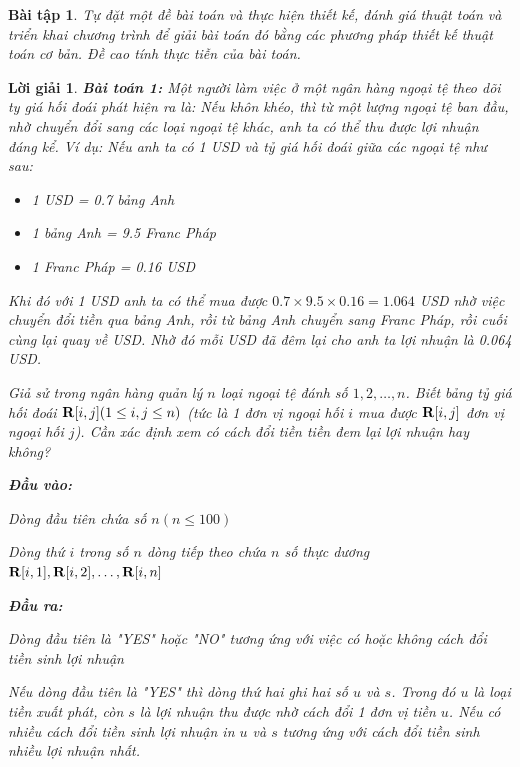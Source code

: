 \documentclass[14pt, a4paper]{article}
\theoremstyle{sltheorem}
\newtheorem{baitap}{Bài tập}
\theoremstyle{soltheorem}
\newtheorem*{loigiai}{Lời giải}
\begin{document}
    \begin{baitap}
        Tự đặt một đề bài toán và thực hiện thiết kế, đánh giá thuật toán và triển khai
        chương trình để giải bài toán đó bằng các phương pháp thiết kế thuật toán cơ bản.
        Đề cao tính thực tiễn của bài toán.

    \end{baitap}

    \begin{loigiai}

        \textbf{Bài toán 1:}
        Một người làm việc ở một ngân hàng ngoại tệ theo dõi ty giá hối đoái phát hiện ra là: Nếu khôn
        khéo, thì từ một lượng ngoại tệ ban đầu, nhờ chuyển đổi sang các loại ngoại tệ khác, anh ta có thể
        thu được lợi nhuận đáng kể.
        Ví dụ: Nếu anh ta có 1 USD và tỷ giá hối đoái giữa các ngoại tệ như sau:
        \begin{itemize}
            \item 1 USD = 0.7 bảng Anh
            \item 1 bảng Anh = 9.5 Franc Pháp 
            \item 1 Franc Pháp = 0.16 USD
        \end{itemize}
        Khi đó với 1 USD anh ta có thể mua được $0.7 \times 9.5 \times 0.16 = 1.064$ USD nhờ việc chuyển đổi tiền qua bảng Anh,
        rồi từ bảng Anh chuyển sang Franc Pháp, rồi cuối cùng lại quay về USD. Nhờ đó mỗi USD đã đêm lại cho anh ta lợi nhuận là 0.064 USD.

        Giả sử trong ngân hàng quản lý $n$ loại ngoại tệ đánh số $1, 2, \dots, n $.
        Biết bảng tỷ giá hối đoái $\bold{R} \lbrack i, j  \rbrack (1 \leq i, j \leq n)$ (tức là 1 đơn vị ngoại hối $i$ mua được $\bold{R} \lbrack i, j \rbrack$ đơn vị ngoại hối $j$).
        Cần xác định xem có cách đổi tiền tiền đem lại lợi nhuận hay không?

        \textbf{Đầu vào:}

        Dòng đầu tiên chứa số $n (n \leq 100)$

        Dòng thứ $i$ trong số $n$ dòng tiếp theo chứa $n$ số thực dương $\bold{R} \lbrack i, 1 \rbrack, \bold{R} \lbrack i, 2 \rbrack, \dots, \bold{R} \lbrack i, n \rbrack$

        \textbf{Đầu ra:}

        Dòng đầu tiên là "YES" hoặc "NO" tương ứng với việc có hoặc không cách đổi tiền sinh lợi nhuận

        Nếu dòng đầu tiên là "YES" thì dòng thứ hai ghi hai số $u$ và $s$. 
        Trong đó $u$ là loại tiền xuất phát, còn $s$ là lợi nhuận thu được nhờ cách đổi 1 đơn vị tiền $u$.
        Nếu có nhiều cách đổi tiền sinh lợi nhuận in $u$ và $s$ tương ứng với cách đổi tiền sinh nhiều lợi nhuận nhất.


\end{loigiai}
\end{document}
